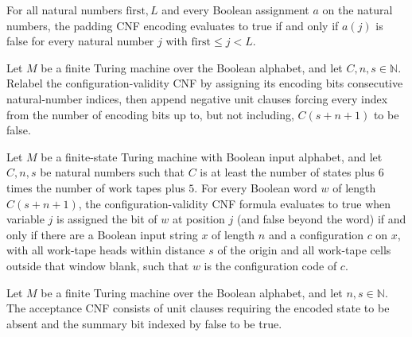 \begin{theorem}
\label{Complexity.codecPadding_eval}
\leanok
{}
For all natural numbers $\mathrm{first},L$ and every Boolean assignment $a$ on the
natural numbers, the padding CNF encoding evaluates to true if and only if $a(j)$ is
false for every natural number $j$ with $\mathrm{first}\le j<L$.
\end{theorem}

\begin{definition}
\label{Complexity.configurationValidity}
\leanok
{}
Let $M$ be a finite Turing machine over the Boolean alphabet, and let
$C,n,s\in\mathbb{N}$. Relabel the configuration-validity CNF by assigning its encoding
bits consecutive natural-number indices, then append negative unit clauses forcing every
index from the number of encoding bits up to, but not including, $C(s+n+1)$ to be false.
\end{definition}

\begin{theorem}
\label{Complexity.configurationValidity_eval}
\leanok
{}
Let $M$ be a finite-state Turing machine with Boolean input alphabet, and let $C,n,s$ be
natural numbers such that $C$ is at least the number of states plus $6$ times the number
of work tapes plus $5$. For every Boolean word $w$ of length $C(s+n+1)$, the
configuration-validity CNF formula evaluates to true when variable $j$ is assigned the
bit of $w$ at position $j$ (and false beyond the word) if and only if there are a
Boolean input string $x$ of length $n$ and a configuration $c$ on $x$, with all
work-tape heads within distance $s$ of the origin and all work-tape cells outside that
window blank, such that $w$ is the configuration code of $c$.
\end{theorem}

\begin{definition}
\label{Complexity.codecAcceptance}
\leanok
{}
Let $M$ be a finite Turing machine over the Boolean alphabet, and let
$n,s\in\mathbb{N}$. The acceptance CNF consists of unit clauses requiring the encoded
state to be absent and the summary bit indexed by false to be true.
\end{definition}

